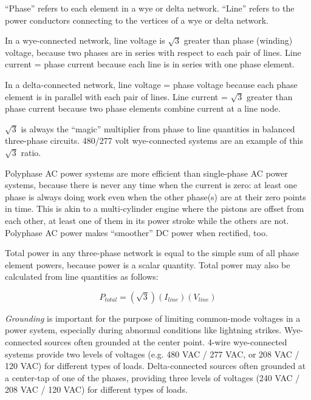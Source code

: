 \vskip 10pt

``Phase'' refers to each element in a wye or delta network.  ``Line'' refers to the power conductors connecting to the vertices of a wye or delta network.  

In a wye-connected network, line voltage is $\sqrt{3}$ greater than phase (winding) voltage, because two phases are in series with respect to each pair of lines.  Line current = phase current because each line is in series with one phase element.

In a delta-connected network, line voltage = phase voltage because each phase element is in parallel with each pair of lines.  Line current = $\sqrt{3}$ greater than phase current because two phase elements combine current at a line node.

$\sqrt{3}$ is always the ``magic'' multiplier from phase to line quantities in balanced three-phase circuits.  480/277 volt wye-connected systems are an example of this $\sqrt{3}$ ratio.

\vskip 10pt

Polyphase AC power systems are more efficient than single-phase AC power systems, because there is never any time when the current is zero: at least one phase is always doing work even when the other phase(s) are at their zero points in time.  This is akin to a multi-cylinder engine where the pistons are offset from each other, at least one of them in its power stroke while the others are not.  Polyphase AC power makes ``smoother'' DC power when rectified, too.

\vskip 10pt

Total power in any three-phase network is equal to the simple sum of all phase element powers, because power is a scalar quantity.  Total power may also be calculated from line quantities as follows:

$$P_{total} = (\sqrt{3}) (I_{line}) (V_{line})$$

\vskip 10pt

{\it Grounding} is important for the purpose of limiting common-mode voltages in a power system, especially during abnormal conditions like lightning strikes.  Wye-connected sources often grounded at the center point.  4-wire wye-connected systems provide two levels of voltages (e.g. 480 VAC / 277 VAC, or 208 VAC / 120 VAC) for different types of loads.  Delta-connected sources often grounded at a center-tap of one of the phases, providing three levels of voltages (240 VAC / 208 VAC / 120 VAC) for different types of loads.


